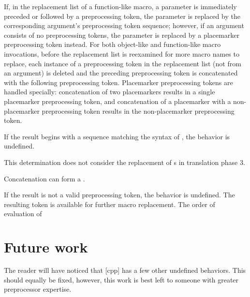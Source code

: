 \documentclass{wg21}
\begin{document}
\pnum
If, in the replacement list of a function-like macro, a parameter is
immediately preceded or followed by a
\tcode{\#\#}
preprocessing token, the parameter is replaced by the
corresponding argument's preprocessing token sequence; however, if an argument consists of no preprocessing tokens, the parameter is
replaced by a placemarker preprocessing token instead.
\pnum
For both object-like and function-like macro invocations, before the
replacement list is reexamined for more macro names to replace,
each instance of a
\tcode{\#\#}
preprocessing token in the replacement list
(not from an argument) is deleted and the
preceding preprocessing token is concatenated
with the following preprocessing token.
Placemarker preprocessing tokens are handled specially: concatenation
of two placemarkers results in a single placemarker preprocessing token, and
concatenation of a placemarker with a non-placemarker preprocessing token results
in the non-placemarker preprocessing token.
\begin{removedblock}
 If the result begins with a sequence matching the syntax of ,
the behavior is undefined.
\begin{note}
    This determination does not consider the replacement of
    s in translation phase 3.
\end{note}
\end{removedblock}
\begin{addedblock}
\begin{note}
Concatenation can form a .
\end{note}
\end{addedblock}
If the result is not a valid preprocessing token,
the behavior is undefined.
The resulting token is available for further macro replacement.
The order of evaluation of
\tcode{\#\#}

\section{Future work}

The reader will have noticed that [cpp] has a few other undefined behaviors.
This should equally be fixed, however, this work is best left to someone with greater preprocessor expertise.
\end{document}
